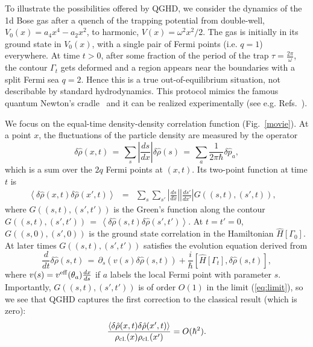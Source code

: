 \documentclass[twocolumn,amsfonts,showpacs,superscriptaddress]{revtex4-1}
\begin{document}
\vspace{0.1cm}
\; To illustrate the possibilities offered by QGHD, we consider the dynamics of the 1d Bose gas after a quench of the trapping potential from double-well, $V_0(x)= a_4 x^4 - a_2 x^2$, to harmonic, $V(x) = \omega^2 x^2/2$. The gas is initially in its ground state in $V_0(x)$, with a single pair of Fermi points (i.e. $q=1$) everywhere. At time $t>0$, after some fraction of the period of the trap $\tau = \frac{2\pi}{\omega}$, the contour $\Gamma_t$ gets deformed and a region appears near the boundaries with a split Fermi sea $q=2$. Hence this is a true out-of-equilibrium situation, not describable by standard hydrodynamics. This protocol mimics the famous quantum Newton's cradle~\cite{kinoshita2006quantum} and it can be realized experimentally (see e.g. Refs.~\cite{schemmer2019generalized,joseph2011observation}).



We focus on the equal-time density-density correlation function (Fig.~\ref{movie}). At a point $x$, the fluctuations of the particle density are measured by the operator 
\begin{equation}
	\delta \hat{\rho} (x,t) \, = \, \sum_s  \left| \frac{ds}{dx} \right| \delta \hat{\rho} (s) \, = \, \sum_{a}  \frac{1}{2\pi \hbar} \delta \hat{p}_a ,
\end{equation}
which is a sum over the $2q$ Fermi points at $(x,t)$. Its two-point function at time $t$ is
\begin{eqnarray} \label{rhorho}
	\left< \delta \hat{\rho} (x,t) \delta \hat{\rho} (x',t) \right>  &=&  \sum_{s} \sum_{s'} \left| \frac{ds}{dx} \right|  \left| \frac{ds'}{dx'} \right| G((s,t),(s',t)) , \nonumber\quad
\end{eqnarray}
where $ G((s,t),(s',t'))$ is the Green's function along the contour $G((s,t) ,(s' ,t')) \, = \, \left< \delta \hat{\rho} (s,t) \delta \hat{\rho} (s',t') \right>$. At $t=t'=0$, $G((s,0),(s',0))$ is the ground state correlation in the Hamiltonian $\hat{H}[\Gamma_0]$. At later times $G((s,t),(s',t'))$ satisfies the evolution equation derived from
\begin{equation}
	\frac{d}{dt} \delta \hat{\rho} (s,t) \, = \, \partial_s (v(s) \delta \hat{\rho} (s,t)) + \frac{i}{\hbar} [ \hat{H} [\Gamma_t], \delta \hat{\rho}(s,t) ] ,
\end{equation}
where $v(s) = v^{\rm eff} (\theta_a) \frac{dx}{ds}$ if $a$ labels the local Fermi point with parameter $s$. Importantly, $G((s,t),(s',t'))$ is of order $O(1)$ in the limit (\ref{eq:limit}), so we see that QGHD captures the first correction to the classical result (which is zero):
\begin{eqnarray}
	\frac{ \left< \delta \hat{\rho} (x,t) \delta \hat{\rho} (x',t) \right> }{\rho_{\rm cl.} (x) \rho_{\rm cl.} (x') 
} = O(\hbar^2) .
\end{eqnarray}
\end{document}
